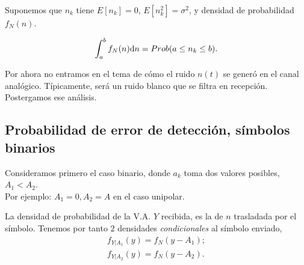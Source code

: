 Suponemos que $n_k$ tiene $E[n_k]=0$, $E[n_k^2]=\sigma^2$, y
densidad de probabilidad $f_N(n)$.

\begin{minipage}{0.5\textwidth}
    \endpgfgraphicnamed
\end{minipage}
\begin{minipage}{0.5\textwidth}
\[\int_a^b f_N(n)\mathrm{d} n = Prob (a\leq n_k \leq b).\]
\end{minipage}

Por ahora no entramos en el tema de cómo el ruido $n(t)$ se generó
en el canal analógico. Típicamente, será un ruido blanco que se
filtra en recepción. Postergamos ese análisis.

\subsection*{Probabilidad de error de detección, símbolos binarios}

Consideramos primero el caso binario, donde $a_k$ toma dos valores
posibles, $A_1 < A_2$. \\ Por ejemplo: $A_1=0, A_2 = A$ en el caso
unipolar.

La densidad de probabilidad de la V.A. $Y$ recibida, es la de $n$
trasladada por el símbolo. Tenemos por tanto $2$ densidades
\emph{condicionales} al símbolo enviado,
\begin{gather*}
    f_{Y|A_1} (y) = f_N(y-A_1);\\
    f_{Y|A_2} (y) = f_N(y-A_2).
\end{gather*}


